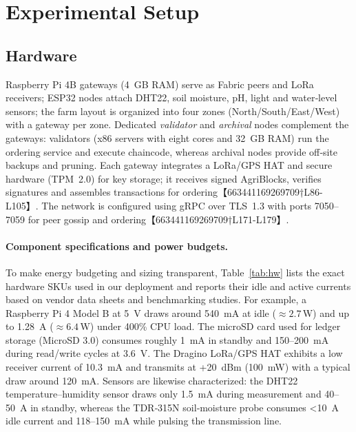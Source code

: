 \section{Experimental Setup}

\subsection{Hardware}
Raspberry Pi 4B gateways (4~GB RAM) serve as Fabric peers and LoRa receivers; ESP32 nodes attach DHT22, soil moisture, pH, light and water‑level sensors; the farm layout is organized into four zones (North/South/East/West) with a gateway per zone.  Dedicated \emph{validator} and \emph{archival} nodes complement the gateways: validators (x86 servers with eight cores and 32~GB RAM) run the ordering service and execute chaincode, whereas archival nodes provide off‑site backups and pruning.  Each gateway integrates a LoRa/GPS HAT and secure hardware (TPM~2.0) for key storage; it receives signed AgriBlocks, verifies signatures and assembles transactions for ordering【663441169269709†L86-L105】.  The network is configured using gRPC over TLS~1.3 with ports 7050–7059 for peer gossip and ordering【663441169269709†L171-L179】.

\paragraph{Component specifications and power budgets.}
To make energy budgeting and sizing transparent, Table~\ref{tab:hw} lists the exact hardware SKUs used in our deployment and reports their idle and active currents based on vendor data sheets and benchmarking studies.  For example, a Raspberry Pi 4 Model B at 5~V draws around 540~mA at idle (\(\approx 2.7\,\)W) and up to 1.28~A (\(\approx 6.4\,\)W) under 400\% CPU load\cite{geerling2020powerbench}.  The microSD card used for ledger storage (MicroSD 3.0) consumes roughly 1~mA in standby and 150–200~mA during read/write cycles at 3.6~V\cite{sanmina2017microsd}.  The Dragino LoRa/GPS HAT exhibits a low receiver current of 10.3~mA and transmits at +20~dBm (100~mW) with a typical draw around 120~mA\cite{dragino2019lorahat}.  Sensors are likewise characterized: the DHT22 temperature–humidity sensor draws only 1.5~mA during measurement and 40–50~\textmu A in standby\cite{dht22datasheet}, whereas the TDR‑315N soil‑moisture probe consumes <10~\textmu A idle current and 118–150~mA while pulsing the transmission line\cite{acclima2017tdr315n}.

